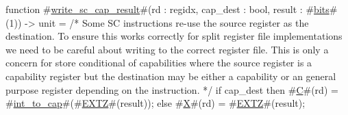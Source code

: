 function #\hyperref[sailRISCVzwritezysczycapzyresult]{write\_sc\_cap\_result}#(rd : regidx, cap_dest : bool, result : #\hyperref[sailRISCVzbits]{bits}#(1)) -> unit = {
  /* Some SC instructions re-use the source register as the destination. To
    ensure this works correctly for split register file implementations we
    need to be careful about writing to the correct register file. This is only
    a concern for store conditional of capabilities where the source register
    is a capability register but the destination may be either a capability or
    an general purpose register depending on the instruction. */
  if cap_dest then {
    #\hyperref[sailRISCVzC]{C}#(rd) = #\hyperref[sailRISCVzintzytozycap]{int\_to\_cap}#(#\hyperref[sailRISCVzEXTZ]{EXTZ}#(result));
  } else {
    #\hyperref[sailRISCVzX]{X}#(rd) = #\hyperref[sailRISCVzEXTZ]{EXTZ}#(result);
  }
}
